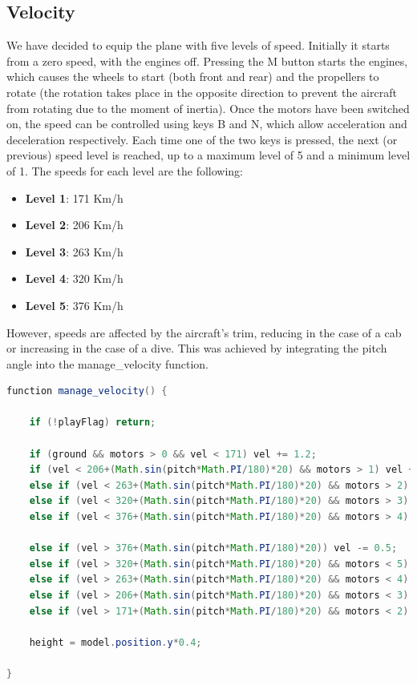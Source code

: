 \documentclass{article}
\begin{document}
\subsection*{Velocity}
We have decided to equip the plane with five levels of speed. Initially it starts from a zero speed, with the engines off. Pressing the M button starts the engines, which causes the wheels to start (both front and rear) and the propellers to rotate (the rotation takes place in the opposite direction to prevent the aircraft from rotating due to the moment of inertia). Once the motors have been switched on, the speed can be controlled using keys B and N, which allow acceleration and deceleration respectively. Each time one of the two keys is pressed, the next (or previous) speed level is reached, up to a maximum level of 5 and a minimum level of 1. The speeds for each level are the following:
\begin{itemize}
\item \textbf{Level 1}: 171 Km/h
\item \textbf{Level 2}: 206 Km/h
\item \textbf{Level 3}: 263 Km/h
\item \textbf{Level 4}: 320 Km/h
\item \textbf{Level 5}: 376 Km/h
\end{itemize}
However, speeds are affected by the aircraft's trim, reducing in the case of a cab or increasing in the case of a dive. This was achieved by integrating the pitch angle into the manage\_velocity function.

\begin{lstlisting}[language=Java, caption=Function manage\_velocity]
function manage_velocity() {

    if (!playFlag) return;

    if (ground && motors > 0 && vel < 171) vel += 1.2;
    if (vel < 206+(Math.sin(pitch*Math.PI/180)*20) && motors > 1) vel += 0.67;
    else if (vel < 263+(Math.sin(pitch*Math.PI/180)*20) && motors > 2) vel += 0.5; 
    else if (vel < 320+(Math.sin(pitch*Math.PI/180)*20) && motors > 3) vel += 0.5; 
    else if (vel < 376+(Math.sin(pitch*Math.PI/180)*20) && motors > 4) vel += 0.33; 

    else if (vel > 376+(Math.sin(pitch*Math.PI/180)*20)) vel -= 0.5; 
    else if (vel > 320+(Math.sin(pitch*Math.PI/180)*20) && motors < 5) vel -= 0.5;
    else if (vel > 263+(Math.sin(pitch*Math.PI/180)*20) && motors < 4) vel -= 0.5;
    else if (vel > 206+(Math.sin(pitch*Math.PI/180)*20) && motors < 3) vel -= 0.5;
    else if (vel > 171+(Math.sin(pitch*Math.PI/180)*20) && motors < 2) vel -= 0.5;

    height = model.position.y*0.4;

}
\end{lstlisting}
\end{document}
